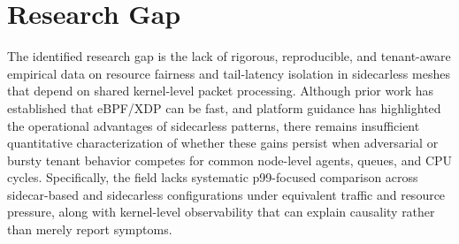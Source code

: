 \section{Research Gap}
The identified research gap is the lack of rigorous, reproducible, and tenant-aware empirical data on resource fairness and tail-latency isolation in sidecarless meshes that depend on shared kernel-level packet processing. Although prior work has established that eBPF/XDP can be fast, and platform guidance has highlighted the operational advantages of sidecarless patterns, there remains insufficient quantitative characterization of whether these gains persist when adversarial or bursty tenant behavior competes for common node-level agents, queues, and CPU cycles. Specifically, the field lacks systematic p99-focused comparison across sidecar-based and sidecarless configurations under equivalent traffic and resource pressure, along with kernel-level observability that can explain causality rather than merely report symptoms.
